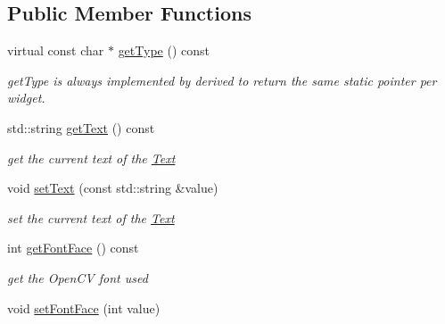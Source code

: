 \subsection*{Public Member Functions}
\begin{DoxyCompactItemize}
\item 
virtual const char $\ast$ \hyperlink{classcanvascv_1_1Text_ae81d87d43167c2e8d1e58fa620a80579}{get\+Type} () const 
\begin{DoxyCompactList}\small\item\em get\+Type is always implemented by derived to return the same static pointer per widget. \end{DoxyCompactList}\item 
std\+::string \hyperlink{classcanvascv_1_1Text_acd9ec2f0271ac420775a029d84361581}{get\+Text} () const \hypertarget{classcanvascv_1_1Text_acd9ec2f0271ac420775a029d84361581}{}\label{classcanvascv_1_1Text_acd9ec2f0271ac420775a029d84361581}

\begin{DoxyCompactList}\small\item\em get the current text of the \hyperlink{classcanvascv_1_1Text}{Text} \end{DoxyCompactList}\item 
void \hyperlink{classcanvascv_1_1Text_aa54bad8c0b8eecdd5cd64138216ec83f}{set\+Text} (const std\+::string \&value)\hypertarget{classcanvascv_1_1Text_aa54bad8c0b8eecdd5cd64138216ec83f}{}\label{classcanvascv_1_1Text_aa54bad8c0b8eecdd5cd64138216ec83f}

\begin{DoxyCompactList}\small\item\em set the current text of the \hyperlink{classcanvascv_1_1Text}{Text} \end{DoxyCompactList}\item 
int \hyperlink{classcanvascv_1_1Text_ad535b8c794ff21380a7c9ccd7132d3ea}{get\+Font\+Face} () const \hypertarget{classcanvascv_1_1Text_ad535b8c794ff21380a7c9ccd7132d3ea}{}\label{classcanvascv_1_1Text_ad535b8c794ff21380a7c9ccd7132d3ea}

\begin{DoxyCompactList}\small\item\em get the Open\+CV font used \end{DoxyCompactList}\item 
void \hyperlink{classcanvascv_1_1Text_af0d610b5c5015df19befd15b3f600a4e}{set\+Font\+Face} (int value)\hypertarget{classcanvascv_1_1Text_af0d610b5c5015df19befd15b3f600a4e}{}\label{classcanvascv_1_1Text_af0d610b5c5015df19befd15b3f600a4e}


\end{DoxyCompactItemize}
